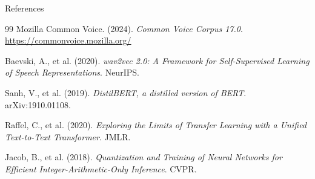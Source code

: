 \documentclass[aspectratio=169,10pt]{beamer}
\begin{document}
\begin{frame}[allowframebreaks]{References}
\begin{thebibliography}{99}
Mozilla Common Voice. (2024). \textit{Common Voice Corpus 17.0}.
\url{https://commonvoice.mozilla.org/}

Baevski, A., et al. (2020). \textit{wav2vec 2.0: A Framework for Self-Supervised Learning of Speech Representations}. NeurIPS.

Sanh, V., et al. (2019). \textit{DistilBERT, a distilled version of BERT}. arXiv:1910.01108.

Raffel, C., et al. (2020). \textit{Exploring the Limits of Transfer Learning with a Unified Text-to-Text Transformer}. JMLR.

Jacob, B., et al. (2018). \textit{Quantization and Training of Neural Networks for Efficient Integer-Arithmetic-Only Inference}. CVPR.
\end{thebibliography}
\end{frame}
\end{document}
